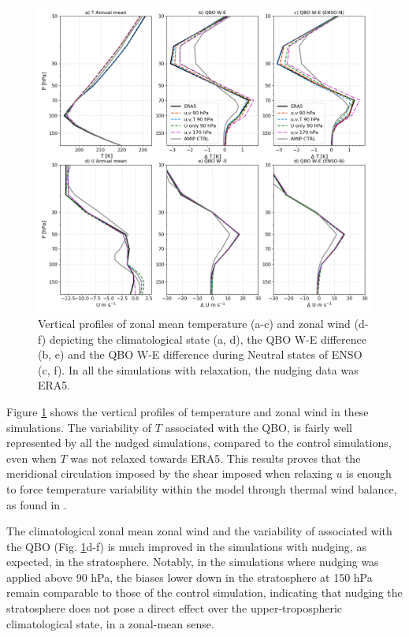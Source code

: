 \begin{figure}[t!]
\centering
 \includegraphics[width=\linewidth]{figures/profilUTclimatology.png}
\caption[Nudging sensitivity QBO profiles]{Vertical profiles of zonal mean temperature (a-c) and zonal wind (d-f) depicting the climatological state (a, d), the QBO W-E difference (b, e) and the QBO W-E difference during Neutral states of ENSO (c, f). In all the simulations with relaxation, the nudging data was ERA5.}
\label{fig:prof_nudg}
\end{figure}

Figure \ref{fig:prof_nudg} shows the vertical profiles of temperature and zonal wind in these simulations. The variability of $T$ associated with the QBO, is fairly well represented by all the nudged simulations, compared to the control simulations, even when $T$ was not relaxed towards ERA5. This results proves that the meridional circulation imposed by the shear imposed when relaxing $u$ is enough to force temperature variability within the model through thermal wind balance, as found in \cite{martin2021}. 

The climatological zonal mean zonal wind and the variability of associated with the QBO (Fig. \ref{fig:prof_nudg}d-f) is much improved in the simulations with nudging, as expected, in the stratosphere. Notably, in the simulations where nudging was applied above 90 hPa, the biases lower down in the stratosphere at 150 hPa remain comparable to those of the control simulation, indicating that nudging the stratosphere does not pose a direct effect over the upper-tropospheric climatological state, in a zonal-mean sense.

